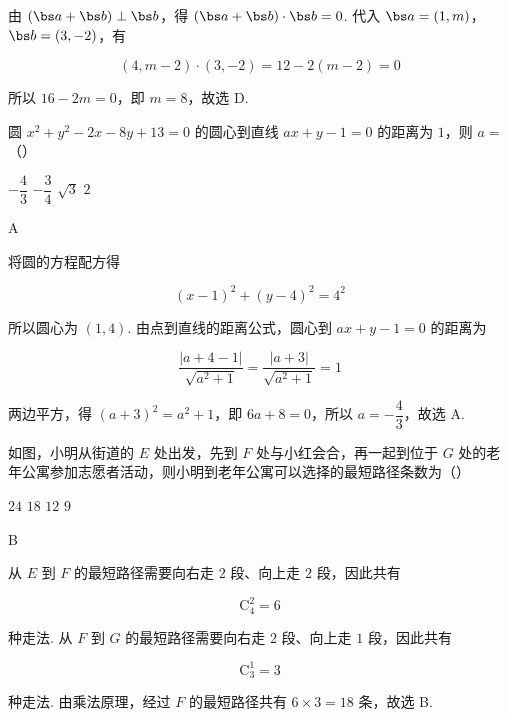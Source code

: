 \begin{solution}
由 \((\bs a+\bs b)\perp\bs b\)，得 \((\bs a+\bs b)\cdot\bs b=0\). 代入 \(\bs a=(1,m)\)，\(\bs b=(3,-2)\)，有

\[
(4,m-2)\cdot(3,-2)=12-2(m-2)=0
\]

所以 \(16-2m=0\)，即 \(m=8\)，故选 D.
\end{solution}

\begin{problem}
圆 \(x^2+y^2-2x-8y+13=0\) 的圆心到直线 \(ax+y-1=0\) 的距离为 \(1\)，则 \(a=\)（\quad）

\choices
    {\(-\dfrac43\)}
    {\(-\dfrac34\)}
    {\(\sqrt3\)}
    {\(2\)}
\end{problem}

\begin{answer}
A
\end{answer}

\begin{solution}
将圆的方程配方得

\[
(x-1)^2+(y-4)^2=4^2
\]

所以圆心为 \((1,4)\). 由点到直线的距离公式，圆心到 \(ax+y-1=0\) 的距离为

\[
\frac{|a+4-1|}{\sqrt{a^2+1}}=\frac{|a+3|}{\sqrt{a^2+1}}=1
\]

两边平方，得 \((a+3)^2=a^2+1\)，即 \(6a+8=0\)，所以 \(a=-\dfrac43\)，故选 A.
\end{solution}

\begin{problem}
如图，小明从街道的 \(E\) 处出发，先到 \(F\) 处与小红会合，再一起到位于 \(G\) 处的老年公寓参加志愿者活动，则小明到老年公寓可以选择的最短路径条数为（\quad）

\begingroup
{}
\endgroup

\choices
    {\(24\)}
    {\(18\)}
    {\(12\)}
    {\(9\)}
\end{problem}

\begin{answer}
B
\end{answer}

\begin{solution}
从 \(E\) 到 \(F\) 的最短路径需要向右走 \(2\) 段、向上走 \(2\) 段，因此共有

\[
\mathrm C_4^2=6
\]

种走法. 从 \(F\) 到 \(G\) 的最短路径需要向右走 \(2\) 段、向上走 \(1\) 段，因此共有

\[
\mathrm C_3^1=3
\]

种走法. 由乘法原理，经过 \(F\) 的最短路径共有 \(6\times3=18\) 条，故选 B.
\end{solution}

